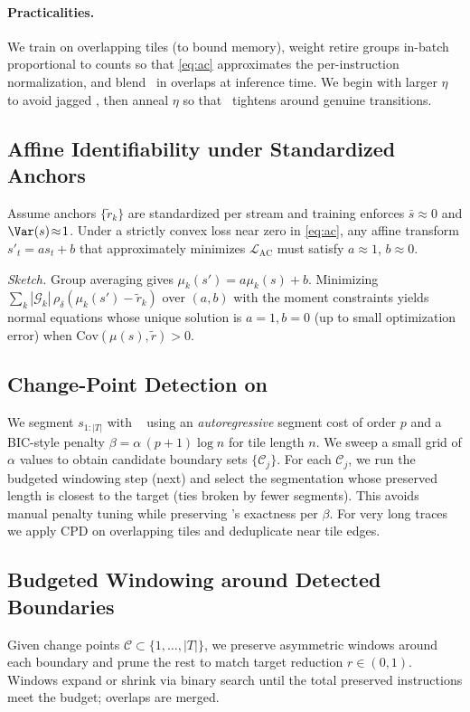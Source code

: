\paragraph{Practicalities.}
We train on overlapping tiles (to bound memory), weight retire groups in-batch proportional to counts so that \eqref{eq:ac} approximates the per-instruction normalization, and blend \pts\ in overlaps at inference time. We begin with larger \(\eta\) to avoid jagged \pts, then anneal \(\eta\) so that \pts\ tightens around genuine transitions.

\subsection{Affine Identifiability under Standardized Anchors}
\label{subsec:identifiability}
Assume anchors \(\{\tilde{r}_k\}\) are standardized per stream and training enforces \(\bar{s}\!\approx\!0\) and \(\Var(s)\!\approx\!1\). Under a strictly convex loss near zero in \eqref{eq:ac}, any affine transform \(s'_t=a s_t+b\) that approximately minimizes \(\mathcal{L}_{\mathrm{AC}}\) must satisfy \(a\!\approx\!1\), \(b\!\approx\!0\).
 
\noindent\emph{Sketch.}
Group averaging gives \(\mu_k(s')=a\mu_k(s)+b\). Minimizing \(\sum_k|\mathcal{G}_k|\,\rho_\delta(\mu_k(s')-\tilde{r}_k)\) over \((a,b)\) with the moment constraints yields normal equations whose unique solution is \(a{=}1,b{=}0\) (up to small optimization error) when \(\mathrm{Cov}(\mu(s),\tilde{r})>0\).


\subsection{Change-Point Detection on \pts}
\label{subsec:cpd}
We segment \(s_{1:|T|}\) with \pelt~\cite{pelt12} using an \emph{autoregressive} segment cost of order \(p\) and a BIC-style penalty \(\beta=\alpha\,(p{+}1)\log n\) for tile length \(n\). We sweep a small grid of \(\alpha\) values to obtain candidate boundary sets \(\{\mathcal{C}_j\}\). For each \(\mathcal{C}_j\), we run the budgeted windowing step (next) and select the segmentation whose preserved length is closest to the target (ties broken by fewer segments). This avoids manual penalty tuning while preserving \pelt’s exactness per \(\beta\). For very long traces we apply CPD on overlapping tiles and deduplicate near tile edges.

\subsection{Budgeted Windowing around Detected Boundaries}
Given change points \(\mathcal{C}\subset\{1,\ldots,|T|\}\), we preserve asymmetric windows around each boundary and prune the rest to match target reduction \(r\in(0,1)\). Windows expand or shrink via binary search until the total preserved instructions meet the budget; overlaps are merged.

